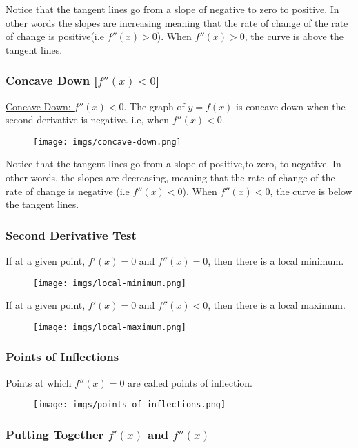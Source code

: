 \documentclass{article}
\begin{document}
Notice that the tangent lines go from a slope of negative to zero to positive. In other words the slopes are increasing meaning that the rate of change of the rate of change is positive(i.e $f''(x)>0$). When $f''(x)>0$, the curve is above the tangent lines. 

\subsubsection{Concave Down [$f''(x)<0$]}
\underline{Concave Down: } $f''(x)<0$. The graph of $y=f(x)$ is concave down when the second derivative is negative. i.e, when $f''(x)<0$.
\begin{figure}[ht]
    \centering
    \texttt{[image: imgs/concave-down.png]}
\end{figure}

Notice that the tangent lines go from a slope of positive,to zero, to negative. In other words, the slopes are decreasing, meaning that the rate of change of the rate of change is negative (i.e  $f''(x)<0$). When $f''(x)<0$, the curve is below the tangent lines.

\subsubsection{Second Derivative Test}
If at a given point, $f'(x)=0$ and $f''(x)=0$, then there is a local minimum.
\begin{figure}[ht]
    \centering
    \texttt{[image: imgs/local-minimum.png]}
\end{figure}

If at a given point, $f'(x)=0$ and $f''(x)<0$, then there is a local maximum.
\begin{figure}[ht]
    \centering
    \texttt{[image: imgs/local-maximum.png]}
\end{figure}

\subsubsection{Points of Inflections}
Points at which $f''(x)=0$ are called points of inflection.
\begin{figure}[ht]
    \centering
    \texttt{[image: imgs/points\_of\_inflections.png]}
\end{figure}
\newpage 
\subsubsection{Putting Together $f'(x)$ and $f''(x)$}
\end{document}
